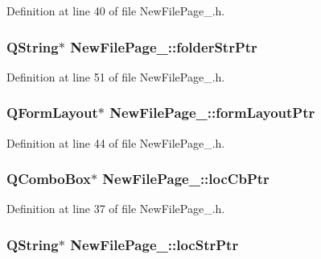 Definition at line 40 of file New\-File\-Page\-\_.\-h.

\hypertarget{class_new_file_page__4_ace9fd5ac4b4aea13c6f6655e521397ec}{
\subsubsection[{folder\-Str\-Ptr}]{\setlength{\rightskip}{0pt plus 5cm}Q\-String$\ast$ New\-File\-Page\-\_\-::folder\-Str\-Ptr\hspace{0.3cm}{\ttfamily [private]}}}\label{class_new_file_page__4_ace9fd5ac4b4aea13c6f6655e521397ec}


Definition at line 51 of file New\-File\-Page\-\_.\-h.

\hypertarget{class_new_file_page__4_a136ab5da5a948efa9b0aad4460f89825}{
\subsubsection[{form\-Layout\-Ptr}]{\setlength{\rightskip}{0pt plus 5cm}Q\-Form\-Layout$\ast$ New\-File\-Page\-\_\-::form\-Layout\-Ptr\hspace{0.3cm}{\ttfamily [private]}}}\label{class_new_file_page__4_a136ab5da5a948efa9b0aad4460f89825}


Definition at line 44 of file New\-File\-Page\-\_.\-h.

\hypertarget{class_new_file_page__4_afd3456441e46868a662023c1f162c7c0}{
\subsubsection[{loc\-Cb\-Ptr}]{\setlength{\rightskip}{0pt plus 5cm}Q\-Combo\-Box$\ast$ New\-File\-Page\-\_\-::loc\-Cb\-Ptr\hspace{0.3cm}{\ttfamily [private]}}}\label{class_new_file_page__4_afd3456441e46868a662023c1f162c7c0}


Definition at line 37 of file New\-File\-Page\-\_.\-h.

\hypertarget{class_new_file_page__4_a1ec00c3d6a8bee7a1b0bfa28d878f06a}{
\subsubsection[{loc\-Str\-Ptr}]{\setlength{\rightskip}{0pt plus 5cm}Q\-String$\ast$ New\-File\-Page\-\_\-::loc\-Str\-Ptr\hspace{0.3cm}{\ttfamily [private]}}}\label{class_new_file_page__4_a1ec00c3d6a8bee7a1b0bfa28d878f06a}


